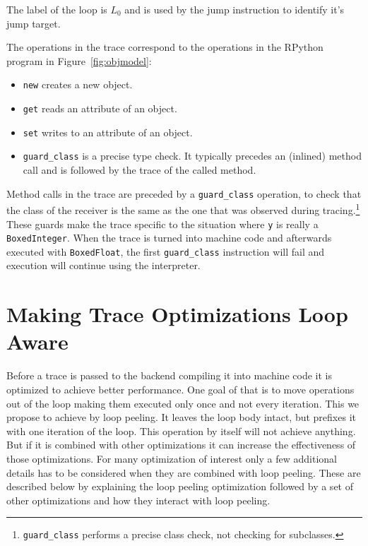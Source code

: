 \documentclass[preprint]{sigplanconf}
\begin{document}
The label of the loop is $L_0$ and is used by the jump instruction to
identify it's jump target.

The operations in the trace correspond to the operations in the RPython program
in Figure~\ref{fig:objmodel}:

\begin{itemize}
    \item \lstinline{new} creates a new object.
    \item \lstinline{get} reads an attribute of an object.
    \item \lstinline{set} writes to an attribute of an object.
    \item \lstinline{guard_class} is a precise type check. It typically precedes
    an (inlined) method call and is followed by the trace of the called method.
\end{itemize}

Method calls in the trace are preceded by a \lstinline{guard_class}
operation, to check that the class of the receiver is the same as the one that
was observed during tracing.\footnote{\lstinline{guard_class}
performs a precise
class check, not checking for subclasses.} These guards make the trace specific
to the situation where \lstinline{y} is really a \lstinline{BoxedInteger}. When
the trace is turned into machine code and afterwards executed with
\lstinline{BoxedFloat}, the
first \lstinline{guard_class} instruction will fail and execution will continue
using the interpreter.

\section{Making Trace Optimizations Loop Aware}

Before a trace is passed to the backend compiling it into machine code
it is optimized to achieve better performance.
One goal of that is to move 
operations out of the loop making them executed only once
and not every iteration. This we propose to achieve by loop peeling. It
leaves the loop body intact, but prefixes it with one iteration of the
loop. This operation by itself will not achieve anything. But if it is
combined with other optimizations it can increase the effectiveness of
those optimizations. For many optimization of interest only a few
additional details has to be considered when they are combined with loop peeling. These are
described below by explaining the loop peeling optimization
followed by a set of other optimizations and how they interact with
loop peeling.
\end{document}
